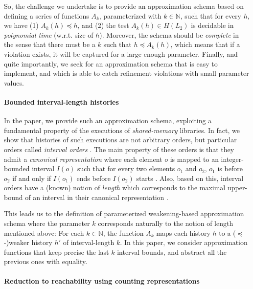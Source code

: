 So, the challenge we undertake is to provide an approximation schema based on
defining a series of functions $A_k$, parameterized with $k \in \mathbb{N}$,
such that for every $h$, we have (1) $A_k (h) \preceq h$, and (2) the test
$A_k(h) \in H(L_2)$ is decidable in \emph{polynomial time} (w.r.t. size of $h$).
Moreover, the schema should be \emph{complete} in the sense that there must be a
$k$ such that $h \preceq A_k(h)$, which means that if a violation exists, it
will be captured for a large enough parameter. Finally, and quite importantly,
we seek for an approximation schema that is easy to implement, and which is
able to catch refinement violations with small parameter values.

\paragraph{Bounded interval-length histories}

In the paper, we provide such an approximation schema, exploiting a fundamental
property of the executions of \emph{shared-memory} libraries. In fact, we show
that histories of such executions are not arbitrary orders, but particular
orders called \emph{interval orders} \cite{}. The main property of these orders
is that they admit a \emph{canonical representation} where each element $o$ is
mapped to an integer-bounded interval $I(o)$ such that for every two elements
$o_1$ and $o_2$, $o_1$ is before $o_2$ if and only if $I(o_1)$ ends before
$I(o_2)$ starts \cite{}. Also, based on this, interval orders have a (known)
notion of \emph{length} which corresponds to the maximal upper-bound of an
interval in their canonical representation \cite{}.

This leads us to the definition of parameterized weakening-based approximation
schema where the parameter $k$ corresponds naturally to the notion of length
mentioned above: For each $k \in \mathbb{N}$, the function $A_k$ maps each
history $h$ to a ($\preceq$-)weaker history $h'$ of interval-length $k$. In
this paper, we consider approximation functions that keep precise the last $k$
interval bounds, and abstract all the previous ones with equality.

\paragraph{Reduction to reachability using counting representations}

